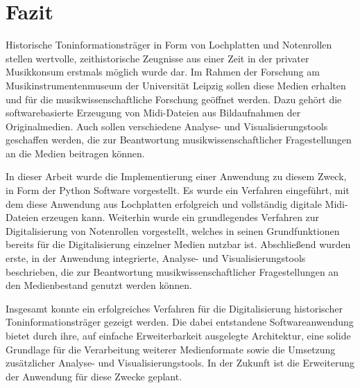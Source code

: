\section{Fazit}

Historische Toninformationsträger in Form von Lochplatten und Notenrollen stellen wertvolle, zeithistorische Zeugnisse aus einer Zeit in der privater Musikkonsum erstmals möglich wurde dar.
Im Rahmen der Forschung am Musikinstrumentenmuseum der Universität Leipzig sollen diese Medien erhalten und für die musikwissenschaftliche Forschung geöffnet werden.
Dazu gehört die softwarebasierte Erzeugung von Midi-Dateien aus Bildaufnahmen der Originalmedien.
Auch sollen verschiedene Analyse- und Visualisierungstools geschaffen werden, die zur Beantwortung musikwissenschaftlicher Fragestellungen an die Medien beitragen können.

In dieser Arbeit wurde die Implementierung einer Anwendung zu diesem Zweck, in Form der Python Software  vorgestellt.
Es wurde ein Verfahren eingeführt, mit dem diese Anwendung aus Lochplatten erfolgreich und vollständig digitale Midi-Dateien erzeugen kann.
Weiterhin wurde ein grundlegendes Verfahren zur Digitalisierung von Notenrollen vorgestellt, welches in seinen Grundfunktionen bereits für die Digitalisierung einzelner Medien nutzbar ist.
Abschließend wurden erste, in der Anwendung integrierte, Analyse- und Visualisierungstools beschrieben, die zur Beantwortung musikwissenschaftlicher Fragestellungen an den Medienbestand genutzt werden können.

Insgesamt konnte ein erfolgreiches Verfahren für die Digitalisierung historischer Toninformationsträger gezeigt werden.
Die dabei entstandene Softwareanwendung bietet durch ihre, auf einfache Erweiterbarkeit ausgelegte Architektur, eine solide Grundlage für die Verarbeitung weiterer Medienformate sowie die Umsetzung zusätzlicher Analyse- und Visualisierungstools.
In der Zukunft ist die Erweiterung der Anwendung für diese Zwecke geplant.